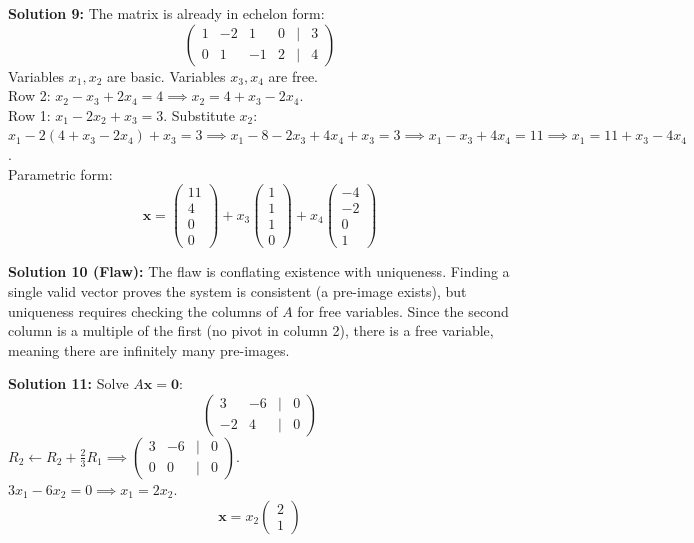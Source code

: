 \documentclass{article}
\begin{document}
\textbf{Solution 9:}
The matrix is already in echelon form:
$$\begin{pmatrix} 1 & -2 & 1 & 0 & | & 3 \\ 0 & 1 & -1 & 2 & | & 4 \end{pmatrix}$$
Variables $x_1, x_2$ are basic. Variables $x_3, x_4$ are free. \\
Row 2: $x_2 - x_3 + 2x_4 = 4 \implies x_2 = 4 + x_3 - 2x_4$. \\
Row 1: $x_1 - 2x_2 + x_3 = 3$. Substitute $x_2$: \\
$x_1 - 2(4 + x_3 - 2x_4) + x_3 = 3 \implies x_1 - 8 - 2x_3 + 4x_4 + x_3 = 3 \implies x_1 - x_3 + 4x_4 = 11 \implies x_1 = 11 + x_3 - 4x_4$. \\
Parametric form:
$$\mathbf{x} = \begin{pmatrix} 11 \\ 4 \\ 0 \\ 0 \end{pmatrix} + x_3 \begin{pmatrix} 1 \\ 1 \\ 1 \\ 0 \end{pmatrix} + x_4 \begin{pmatrix} -4 \\ -2 \\ 0 \\ 1 \end{pmatrix}$$

\textbf{Solution 10 (Flaw):}
The flaw is conflating existence with uniqueness. Finding a single valid vector proves the system is consistent (a pre-image exists), but uniqueness requires checking the columns of $A$ for free variables. Since the second column is a multiple of the first (no pivot in column 2), there is a free variable, meaning there are infinitely many pre-images.

\textbf{Solution 11:}
Solve $A\mathbf{x} = \mathbf{0}$:
$$\begin{pmatrix} 3 & -6 & | & 0 \\ -2 & 4 & | & 0 \end{pmatrix}$$
$R_2 \leftarrow R_2 + \frac{2}{3}R_1 \implies \begin{pmatrix} 3 & -6 & | & 0 \\ 0 & 0 & | & 0 \end{pmatrix}$. \\
$3x_1 - 6x_2 = 0 \implies x_1 = 2x_2$. \\
$$\mathbf{x} = x_2 \begin{pmatrix} 2 \\ 1 \end{pmatrix}$$
\end{document}
